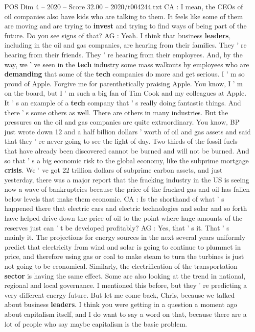 \begin{textsample}{POS Dim 4 – 2020 – Score 32.00 – 2020/t004244.txt}
CA : I mean, the CEOs of oil companies also have kids who are talking to them.
It feels like some of them are moving and are trying to \textbf{invest} and trying to find ways of being part of the future.
Do you see signs of that?
AG : Yeah.
I think that business \textbf{leaders}, including in the oil and gas companies, are hearing from their families.
They ' re hearing from their friends.
They ' re hearing from their employees.
And, by the way, we ' ve seen in the \textbf{tech} industry some mass walkouts by employees who are \textbf{demanding} that some of the \textbf{tech} companies do more and get serious.
I ' m so proud of Apple.
Forgive me for parenthetically praising Apple.
You know, I ' m on the board, but I ' m such a big fan of Tim Cook and my colleagues at Apple.
It ' s an example of a \textbf{tech} company that ' s really doing fantastic things.
And there ' s some others as well.
There are others in many industries.
But the pressures on the oil and gas companies are quite extraordinary.
You know, BP just wrote down 12 and a half billion dollars ' worth of oil and gas assets and said that they ' re never going to see the light of day.
Two-thirds of the fossil fuels that have already been discovered cannot be burned and will not be burned.
And so that ' s a big economic risk to the global economy, like the subprime mortgage \textbf{crisis}.
We ' ve got 22 trillion dollars of subprime carbon assets, and just yesterday, there was a major report that the fracking industry in the US is seeing now a wave of bankruptcies because the price of the fracked gas and oil has fallen below levels that make them economic.
CA : Is the shorthand of what ' s happened there that electric cars and electric technologies and solar and so forth have helped drive down the price of oil to the point where huge amounts of the reserves just can ' t be developed profitably?
AG : Yes, that ' s it.
That ' s mainly it.
The projections for energy sources in the next several years uniformly predict that electricity from wind and solar is going to continue to plummet in price, and therefore using gas or coal to make steam to turn the turbines is just not going to be economical.
Similarly, the electrification of the transportation \textbf{sector} is having the same effect.
Some are also looking at the trend in national, regional and local governance.
I mentioned this before, but they ' re predicting a very different energy future.
But let me come back, Chris, because we talked about business \textbf{leaders}.
I think you were getting in a question a moment ago about capitalism itself, and I do want to say a word on that, because there are a lot of people who say maybe capitalism is the basic problem.

\end{textsample}
